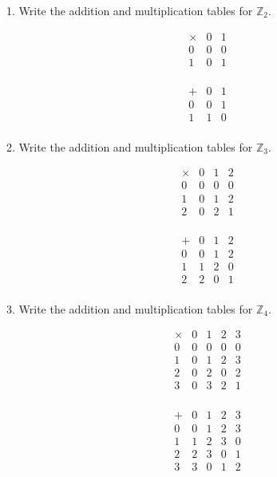 \documentclass{hippoidC}
\begin{document}
\toc
\thispagestyle{styleTOC}
\pagebreak
\pagestyle{styleE}

\begin{prooflist}{1. Write the addition and multiplication tables for $\mathbb{Z}_2$.}
\item
    \[
\begin{array}{c|cc}
\times & 0 & 1 \\
\hline
0 & 0 & 0 \\
1 & 0 & 1 \\
\end{array}
\]
\item
    \[
\begin{array}{c|cc}
+ & 0 & 1 \\
\hline
0 & 0 & 1 \\
1 & 1 & 0 \\
\end{array}
\]
\end{prooflist}

\begin{prooflist}{2. Write the addition and multiplication tables for $\mathbb{Z}_3$.}
\item \[
\begin{array}{c|ccc}
\times & 0 & 1 & 2 \\
\hline
0 & 0 & 0 & 0 \\
1 & 0 & 1 & 2 \\
2 & 0 & 2 & 1 \\
\end{array}
\]
\item \[
\begin{array}{c|ccc}
+ & 0 & 1 & 2 \\
\hline
0 & 0 & 1 & 2 \\
1 & 1 & 2 & 0 \\
2 & 2 & 0 & 1 \\
\end{array}
\]
\end{prooflist}

\begin{prooflist}{3. Write the addition and multiplication tables for $\mathbb{Z}_4$.}
\item \[
\begin{array}{c|cccc}
\times & 0 & 1 & 2 & 3 \\
\hline
0 & 0 & 0 & 0 & 0 \\
1 & 0 & 1 & 2 & 3 \\
2 & 0 & 2 & 0 & 2 \\
3 & 0 & 3 & 2 & 1 \\
\end{array} \]
\item \[
\begin{array}{c|cccc}
+ & 0 & 1 & 2 & 3 \\
\hline
0 & 0 & 1 & 2 & 3 \\
1 & 1 & 2 & 3 & 0 \\
2 & 2 & 3 & 0 & 1 \\
3 & 3 & 0 & 1 & 2 \\
\end{array} \]

\end{prooflist}
\end{document}
